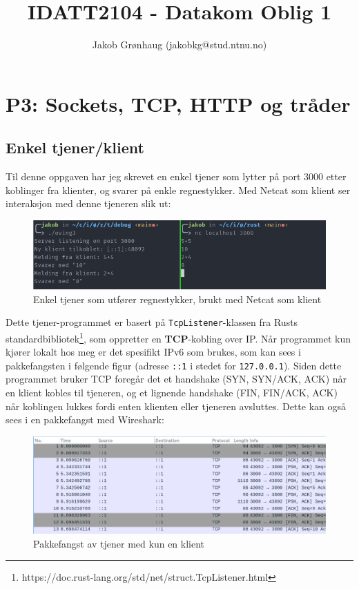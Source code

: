 \documentclass{article}
\title{IDATT2104 - Datakom Oblig 1}
\author{Jakob Grønhaug (jakobkg@stud.ntnu.no)}
\newcommand{\code}[1]{\colorbox{light-gray}{\texttt{#1}}}
\begin{document}
\maketitle

\tableofcontents

\section{P3: Sockets, TCP, HTTP og tråder}

\subsection{Enkel tjener/klient}

Til denne oppgaven har jeg skrevet en enkel tjener som lytter på port 3000 etter koblinger fra klienter, og svarer på enkle regnestykker. Med Netcat som klient ser interaksjon med denne tjeneren slik ut:

\begin{figure}[h]
    \centering
    \includegraphics[width=.8\linewidth]{illustrasjoner/P3-enkel-terminal.png}
    \caption{Enkel tjener som utfører regnestykker, brukt med Netcat som klient}
\end{figure}

Dette tjener-programmet er basert på \code{TcpListener}-klassen fra Rusts standardbibliotek\footnote{https://doc.rust-lang.org/std/net/struct.TcpListener.html}, som oppretter en \textbf{TCP}-kobling over IP. Når programmet kun kjører lokalt hos meg er det spesifikt IPv6 som brukes, som kan sees i pakkefangsten i følgende figur (adresse \texttt{::1} i stedet for \texttt{127.0.0.1}). Siden dette programmet bruker TCP foregår det et handshake (SYN, SYN/ACK, ACK) når en klient kobles til tjeneren, og et lignende handshake (FIN, FIN/ACK, ACK) når koblingen lukkes fordi enten klienten eller tjeneren avsluttes. Dette kan også sees i en pakkefangst med Wireshark:

\begin{figure}[h]
    \centering
    \includegraphics[width=.8\linewidth]{illustrasjoner/P3-enkel-capture.png}
    \caption{Pakkefangst av tjener med kun en klient}
    \label{fig2}
\end{figure}
\end{document}
